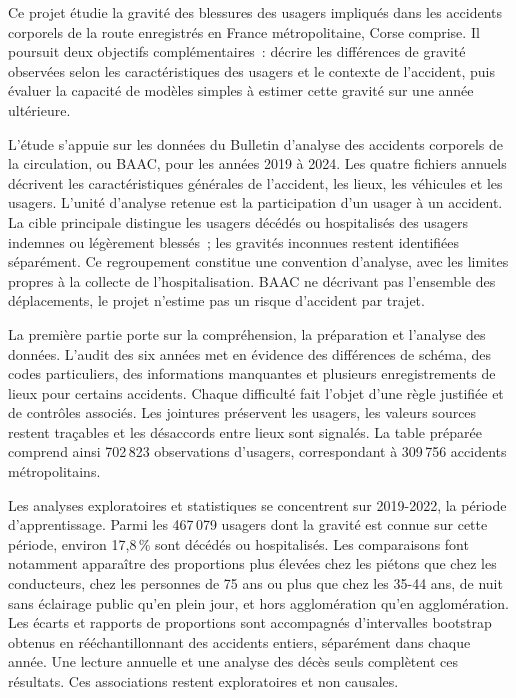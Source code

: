 Ce projet étudie la gravité des blessures des usagers impliqués dans les accidents
corporels de la route enregistrés en France métropolitaine, Corse comprise. Il poursuit
deux objectifs complémentaires~: décrire les différences de gravité observées selon les
caractéristiques des usagers et le contexte de l'accident, puis évaluer la capacité de
modèles simples à estimer cette gravité sur une année ultérieure.

L'étude s'appuie sur les données du Bulletin d'analyse des accidents corporels de la
circulation, ou BAAC, pour les années 2019 à 2024. Les quatre fichiers annuels décrivent
les caractéristiques générales de l'accident, les lieux, les véhicules et les usagers.
L'unité d'analyse retenue est la participation d'un usager à un accident. La cible
principale distingue les usagers décédés ou hospitalisés des usagers indemnes ou
légèrement blessés~; les gravités inconnues restent identifiées séparément. Ce
regroupement constitue une convention d'analyse, avec les limites propres à la collecte
de l'hospitalisation. BAAC ne décrivant pas l'ensemble des déplacements, le projet
n'estime pas un risque d'accident par trajet.

La première partie porte sur la compréhension, la préparation et l'analyse des données.
L'audit des six années met en évidence des différences de schéma, des codes particuliers,
des informations manquantes et plusieurs enregistrements de lieux pour certains accidents.
Chaque difficulté fait l'objet d'une règle justifiée et de contrôles associés. Les
jointures préservent les usagers, les valeurs sources restent traçables et les désaccords
entre lieux sont signalés. La table préparée comprend ainsi 702\,823 observations
d'usagers, correspondant à 309\,756 accidents métropolitains.

Les analyses exploratoires et statistiques se concentrent sur 2019-2022, la période
d'apprentissage. Parmi les 467\,079 usagers dont la gravité est connue sur cette période,
environ 17,8\,\% sont décédés ou hospitalisés. Les comparaisons font notamment apparaître
des proportions plus élevées chez les piétons que chez les conducteurs, chez les personnes
de 75 ans ou plus que chez les 35-44 ans, de nuit sans éclairage public qu'en plein jour,
et hors agglomération qu'en agglomération. Les écarts et rapports de proportions sont
accompagnés d'intervalles bootstrap obtenus en rééchantillonnant des accidents entiers,
séparément dans chaque année. Une lecture annuelle et une analyse des décès seuls
complètent ces résultats. Ces associations restent exploratoires et non causales.

